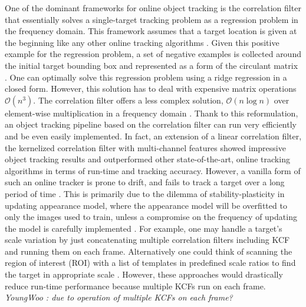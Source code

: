 \documentclass[10pt,twocolumn,letterpaper]{article}
\begin{document}
One of the dominant frameworks for online object tracking is the
correlation filter that essentially solves a single-target tracking
problem as a regression problem in the frequency domain. This
framework assumes that a target location is given at the beginning
like any other online tracking algorithms
\cite{smeulders2014survey}. Given this positive example for the
regression problem, a set of negative examples is collected around the
initial target bounding box and represented as a form of the circulant
matrix \cite{henriques2015high}. One can optimally solve this
regression problem using a ridge regression in a closed form. However,
this solution has to deal with expensive matrix operations
$\mathcal{O}(n^{3})$. The correlation filter offers a less complex
solution, $\mathcal{O}(n\log n)$ over element-wise multiplication in a
frequency domain \cite{bolme2010visual,henriques2015high}. Thank to
this reformulation, an object tracking pipeline based on the
correlation filter can run very efficiently and be even easily
implemented. In fact, an extension of a linear correlation filter, the
kernelized correlation filter with multi-channel features
\cite{henriques2015high} showed impressive object tracking results and
outperformed other state-of-the-art, online tracking algorithms in
terms of run-time and tracking accuracy. However, a vanilla form of
such an online tracker is prone to drift, and fails to track a target
over a long period of time \cite{henriques2015high}. This is primarily
due to the dilemma of stability-plasticity in updating appearance
model, where the appearance model will be overfitted to only the
images used to train, unless a compromise on the frequency of updating
the model is carefully implemented \cite{santner2010prost}. For
example, one may handle a target's scale variation by just
concatenating multiple correlation filters including KCF and running
them on each frame. Alternatively one could think of scanning the
region of interest (ROI) with a list of templates in predefined scale
ratios to find the target in appropriate scale
\cite{henriques2015high,tang2015multi,ma2015long,bibi2015multi,li2014scale}. However,
these approaches would drastically reduce run-time performance because
multiple KCFs run on each frame. \textit{YoungWoo : due to operation of multiple KCFs on each frame?}
\end{document}
